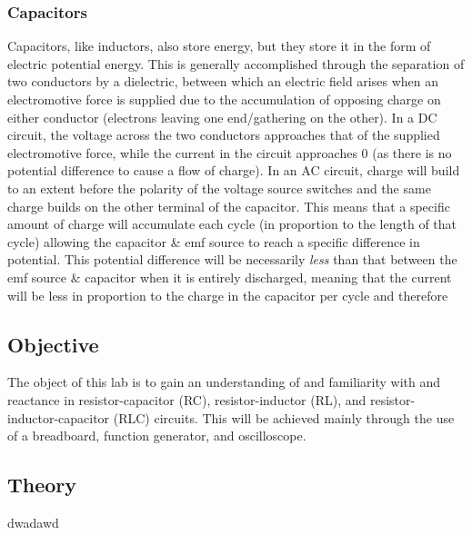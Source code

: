 \documentclass{article}
\begin{document}
			\subsubsection*{Capacitors}
				Capacitors, like inductors, also store energy, but they store it in the form of electric potential energy. This is generally accomplished through the separation of two conductors by a dielectric, between which an electric field arises when an electromotive force is supplied due to the accumulation of opposing charge on either conductor (electrons leaving one end/gathering on the other).
				In a DC circuit, the voltage across the two conductors approaches that of the supplied electromotive force, while the current in the circuit approaches 0 (as there is no potential difference to cause a flow of charge).
				In an AC circuit, charge will build to an extent before the polarity of the voltage source switches and the same charge builds on the other terminal of the capacitor. This means that a specific amount of charge will accumulate each cycle (in proportion to the length of that cycle) allowing the capacitor \& emf source to reach a specific difference in potential. This potential difference will be necessarily \emph{less} than that between the emf source \& capacitor when it is entirely discharged, meaning that the current will be less in proportion to the charge in the capacitor per cycle and therefore 


		\subsection{Objective}
			The object of this lab is to gain an understanding of and familiarity with and reactance in resistor-capacitor (RC), resistor-inductor (RL), and resistor-inductor-capacitor (RLC) circuits. This will be achieved mainly through the use of a breadboard, function generator, and oscilloscope.

		\subsection{Theory}
			dwadawd
\end{document}
